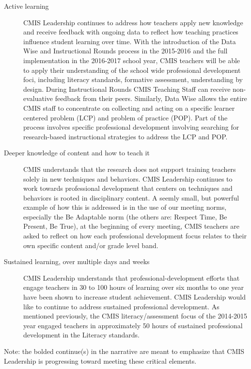 \begin{findings}
\begin{description}
\item [Active learning] CMIS Leadership continues to address how teachers apply new knowledge and receive feedback with ongoing data to reflect how teaching practices influence student learning over time. With the introduction of the Data Wise and Instructional Rounds process in the 2015-2016 and the full implementation in the 2016-2017 school year, CMIS teachers will be able to apply their understanding of the school wide professional development foci, including literacy standards, formative assessment, understanding by design. During Instructional Rounds CMIS Teaching Staff can receive non-evaluative feedback from their peers. Similarly, Data Wise allows the entire CMIS staff to concentrate on collecting and acting on a  specific learner centered problem (LCP) and problem of practice (POP). Part of the process involves specific professional development involving searching for research-based instructional strategies to address the LCP and POP. 
\item [Deeper knowledge of content and how to teach it] CMIS understands that the research does not support training teachers solely in new techniques and behaviors. CMIS Leadership continues to work towards professional development that centers on techniques and behaviors is rooted in disciplinary content. A seemly small, but powerful example of how this is addressed is in the use of our meeting norms, especially the Be Adaptable norm (the others are: Respect Time, Be Present, Be True), at the beginning of every meeting, CMIS teachers are asked to reflect on how each professional development focus relates to their own specific content and/or grade level band. 
\item [Sustained learning, over multiple days and weeks] CMIS Leadership understands that professional-development efforts that engage teachers in 30 to 100 hours of learning over six months to one year have been shown to increase student achievement. CMIS Leadership would like to continue to address sustained professional development. As mentioned previously, the CMIS literacy/assessment focus of the 2014-2015 year engaged teachers in approximately 50 hours of sustained professional development in the Literacy standards. 
\end{description}

Note: the bolded continue(s) in the narrative are meant to emphasize that CMIS Leadership is progressing toward meeting these critical elements. 



\end{findings}
